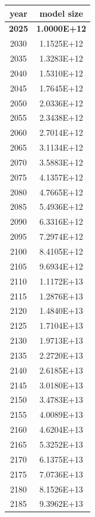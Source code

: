 \documentclass[a4paper]{article}
\begin{document}
	\pagebreak
	
	\small

    \begin{tabular}{| c | c |}
    	\hline
    	year & model size \\\hline
    	\textbf{2025} & \textbf{1.0000E+12} \\\hline
    	2030 & 1.1525E+12 \\\hline
    	2035 & 1.3283E+12 \\\hline
    	2040 & 1.5310E+12 \\\hline
    	2045 & 1.7645E+12 \\\hline
    	2050 & 2.0336E+12 \\\hline
    	2055 & 2.3438E+12 \\\hline
    	2060 & 2.7014E+12 \\\hline
    	2065 & 3.1134E+12 \\\hline
    	2070 & 3.5883E+12 \\\hline
    	2075 & 4.1357E+12 \\\hline
    	2080 & 4.7665E+12 \\\hline
    	2085 & 5.4936E+12 \\\hline
    	2090 & 6.3316E+12 \\\hline
    	2095 & 7.2974E+12 \\\hline
    	2100 & 8.4105E+12 \\\hline
    	2105 & 9.6934E+12 \\\hline
    	2110 & 1.1172E+13 \\\hline
    	2115 & 1.2876E+13 \\\hline
    	2120 & 1.4840E+13 \\\hline
    	2125 & 1.7104E+13 \\\hline
    	2130 & 1.9713E+13 \\\hline
    	2135 & 2.2720E+13 \\\hline
    	2140 & 2.6185E+13 \\\hline
    	2145 & 3.0180E+13 \\\hline
    	2150 & 3.4783E+13 \\\hline
    	2155 & 4.0089E+13 \\\hline
    	2160 & 4.6204E+13 \\\hline
    	2165 & 5.3252E+13 \\\hline
    	2170 & 6.1375E+13 \\\hline
    	2175 & 7.0736E+13 \\\hline
    	2180 & 8.1526E+13 \\\hline
    	2185 & 9.3962E+13 \\\hline

\end{tabular}
\end{document}
